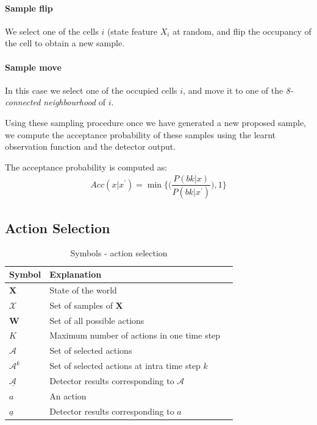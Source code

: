 \documentclass[10pt,twocolumn,letterpaper]{article}
\begin{document}
\paragraph{Sample flip}
We select one of the cells $i$ (state feature $X_{i}$ at random, and flip the occupancy of the cell to obtain a new sample.
\paragraph{Sample move} 
In this case we select one of the occupied cells $i$, and move it to one of the \textit{8-connected neighbourhood} of $i$.

Using these sampling procedure once we have generated a new proposed sample, we compute the acceptance probability of these samples using the learnt observation function and the detector output.

The acceptance probability is computed as:
\begin{align}
Acc(x|x^{'}) = \min\Big\lbrace\Big(\dfrac{P(bk|x)}{P(bk|x^{'})}\Big),1\Big\rbrace
\end{align}


\subsection{ Action Selection}

\begin{table}[ht]
  \begin{tabular}{lll}
   \hline
   Symbol & Explanation \\
   \hline
$\textbf{X} $ & State of the world\\
 $\mathcal{X} $ & Set of samples of $\textbf{X}$ \\
 $\textbf{W} $ & Set of all possible actions\\
 $K$ & Maximum number of actions in one time step\\
 $\mathcal{A} $ & Set of selected actions\\
 $\mathcal{A}^{k} $ & Set of selected actions at intra time step $k$\\
 $\underline{\mathcal{A}} $ & Detector results corresponding to $\mathcal{A}$\\
 $a $ & An action\\
 $ \underline{a} $ & Detector results corresponding to $ a$\\
   \hline
  \end{tabular}
  \caption{
    Symbols - action selection
  }
  \label{tab:Symbols in action selection}
\end{table}
\end{document}

